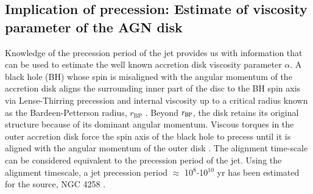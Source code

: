 %

%
%
\subsection{Implication of precession: Estimate of viscosity parameter of the AGN disk}
Knowledge of the precession period of the jet provides us with information that can be used to estimate the well known accretion disk viscosity parameter $\alpha$. A black hole (BH) whose spin is misaligned with the angular momentum of the accretion disk aligns the surrounding inner part of the disc to the BH spin axis via Lense-Thirring precession and internal viscosity up to a critical radius known as the Bardeen-Petterson radius, $r_\mathrm{BP}$ \citep{bardeen75}. Beyond $r_{\rm BP}$, the disk retains its original structure because of its dominant angular momentum. Viscous torques in the outer accretion disk force the spin axis of the black hole to precess until it is aligned with the angular momentum of the outer disk \citep{rees78, scheuer96, natarajan98, caproni07}. The alignment time-scale can be considered equivalent to the precession period of the jet. Using the alignment timescale, a jet precession period $\approx$ 10$^8$-10$^{10}$ yr has been estimated for the source, NGC 4258 \citep{caproni07}. 

